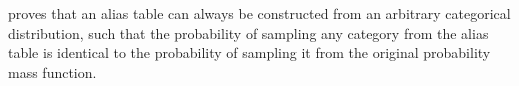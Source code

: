     \citet{alias_method_two} proves that an alias table can always be constructed from an arbitrary categorical distribution, such that the probability of sampling any category from the alias table is identical to the probability of sampling it from the original probability mass function. 


    



        




